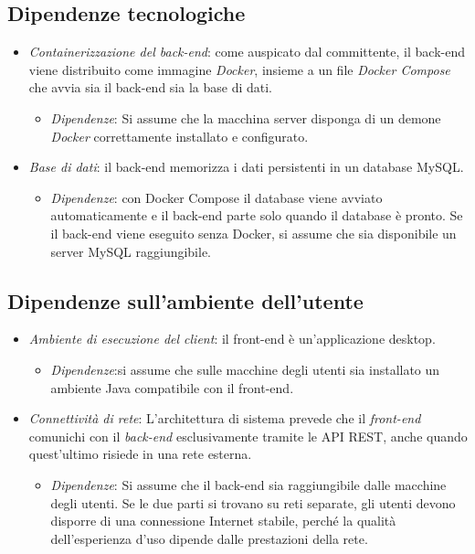 \subsection{Dipendenze tecnologiche}
\begin{itemize}
  \item \textit{Containerizzazione del back-end}: come auspicato dal committente, il back-end viene distribuito come immagine \textit{Docker}, insieme a un file \textit{Docker Compose} che avvia sia il back-end sia la base di dati.

  \begin{itemize}
  \item \textit{Dipendenze}: Si assume che la macchina server disponga di un demone \textit{Docker} correttamente installato e configurato.
\end{itemize}
\end{itemize}
\begin{itemize}
  \item \textit{Base di dati}: il back-end memorizza i dati persistenti in un database MySQL.
  \begin{itemize}
  \item \textit{Dipendenze}: con Docker Compose il database viene avviato automaticamente e il back-end parte solo quando il database è pronto. Se il back-end viene eseguito senza Docker, si assume che sia disponibile un server MySQL raggiungibile.
\end{itemize}
\end{itemize}

\subsection{Dipendenze sull'ambiente dell'utente}
\begin{itemize}
  \item \textit{Ambiente di esecuzione del client}: il front-end è un'applicazione desktop.  \begin{itemize}
  \item \textit{Dipendenze}:si assume che sulle macchine degli utenti sia installato un ambiente Java compatibile con il front-end.
\end{itemize}
\end{itemize}

\begin{itemize}
  \item \textit{Connettività di rete}: L'architettura di sistema prevede 
  che il \textit{front-end} comunichi con il \textit{back-end} esclusivamente tramite le API REST, anche 
  quando quest'ultimo risiede in una rete esterna.
  \begin{itemize}
  \item \textit{Dipendenze}: Si assume che il back-end sia raggiungibile dalle macchine degli utenti. Se le due parti si trovano su reti separate, gli utenti devono disporre di una connessione Internet stabile, perché la qualità dell'esperienza d'uso dipende dalle prestazioni della rete.
\end{itemize}
\end{itemize}
